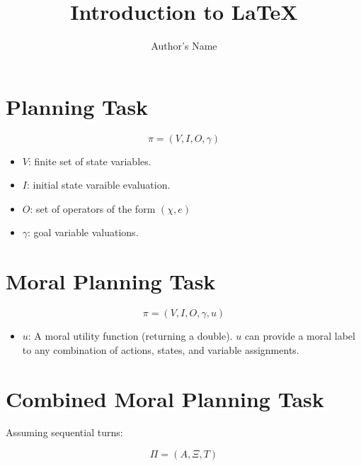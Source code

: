\documentclass{article}
\begin{document}
\title{Introduction to \LaTeX{}}
\author{Author's Name}

\maketitle

\section{Planning Task}
\begin{equation}
\pi = (V, I, O, \gamma)
\end{equation}

\begin{itemize}
\item $V$: finite set of state variables.
\item $I$: initial state varaible evaluation.
\item $O$: set of operators of the form $(\chi, e)$
\item $\gamma$: goal variable valuations.
\end{itemize}

\section{Moral Planning Task}
\begin{equation}
\pi = (V, I, O, \gamma, u)
\end{equation}

\begin{itemize}
\item $u$: A moral utility function (returning a double). $u$ can provide a moral label to any combination of actions, states, and variable assignments.
\end{itemize}

\section{Combined Moral Planning Task}
Assuming sequential turns:

\begin{equation}
\Pi=(A, \Xi, T)
\end{equation}
\end{document}
